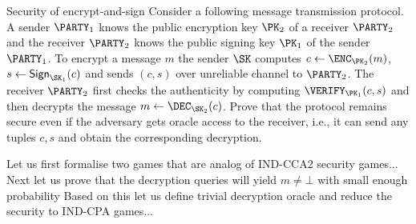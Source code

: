 \documentclass{crypto-exercise}
\author{Sven Laur}
\begin{document}
\begin{exercise}{Security of encrypt-and-sign}
Consider a following message transmission protocol. A sender
  $\PARTY_1$ knows the public encryption key $\PK_2$ of a receiver
  $\PARTY_2$ and the receiver $\PARTY_2$ knows the public signing key
  $\PK_1$ of the sender $\PARTY_1$. To encrypt a message $m$ the
  sender $\SK$ computes $c\gets\ENC_{\PK_2}(m)$,
  $s\gets\SIGN_{\SK_1}(c)$ and sends $(c,s)$ over unreliable channel
  to $\PARTY_2$. The receiver $\PARTY_2$ first checks the authenticity
  by computing $\VERIFY_{\PK_1}(c,s)$ and then decrypts the message
  $m\gets\DEC_{\SK_2}(c)$.
Prove that the protocol remains secure even if the adversary gets oracle access to the receiver, i.e., it can send any tuples $c, s$ and obtain the corresponding decryption. 
\end{exercise}
\begin{solution}
Let us first formalise two games that are analog of IND-CCA2 security games...
Next let us prove that the decryption queries will yield $m\neq \bot$ with small enough probability
Based on this let us define trivial decryption oracle and reduce the security to IND-CPA games...

\end{solution}
\end{document}

